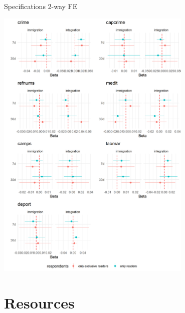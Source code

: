 \documentclass[
  ignorenonframetext,
]{beamer}
\begin{document}
\begin{frame}{Specifications 2-way FE}
\protect\hypertarget{specifications-2-way-fe}{}
\centering

\includegraphics[width=0.7\textwidth,height=\textheight]{vis/effectplot_frames_fe_abs.png}
\end{frame}

\hypertarget{resources}{%
\section{Resources}\label{resources}}
\end{document}
